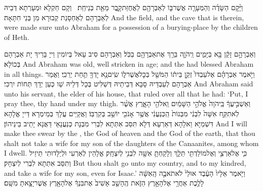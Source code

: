{וַיָּ֨קׇם הַשָּׂדֶ֜ה וְהַמְּעָרָ֧ה אֲשֶׁר\maqqaf בּ֛וֹ לְאַבְרָהָ֖ם לַאֲחֻזַּת\maqqaf קָ֑בֶר מֵאֵ֖ת בְּנֵי\maqqaf חֵֽת׃ \setuma }
{וְקָם חַקְלָא וּמְעָרְתָא דְּבֵיהּ לְאַבְרָהָם לְאַחְסָנַת קְבוּרָא מִן בְּנֵי חִתָּאָה׃}
{And the field, and the cave that is therein, were made sure unto Abraham for a possession of a burying-place by the children of Heth.}{}

\newperek
\newseder
{}%
{וְאַבְרָהָ֣ם זָקֵ֔ן בָּ֖א בַּיָּמִ֑ים וַֽיהֹוָ֛ה בֵּרַ֥ךְ אֶת\maqqaf אַבְרָהָ֖ם בַּכֹּֽל׃}
{וְאַבְרָהָם סִיב עָאל בְּיוֹמִין וַייָ בָּרֵיךְ יָת אַבְרָהָם בְּכוֹלָא׃}
{And Abraham was old, well stricken in age; and the \lord\space had blessed Abraham in all things.}{}
{וַיֹּ֣אמֶר אַבְרָהָ֗ם אֶל\maqqaf עַבְדּוֹ֙ זְקַ֣ן בֵּית֔וֹ הַמֹּשֵׁ֖ל בְּכׇל\maqqaf אֲשֶׁר\maqqaf ל֑וֹ שִֽׂים\maqqaf נָ֥א יָדְךָ֖ תַּ֥חַת יְרֵכִֽי׃}
{וַאֲמַר אַבְרָהָם לְעַבְדֵּיהּ סָבָא דְּבֵיתֵיהּ דְּשַׁלִּיט בְּכָל דְּלֵיהּ שַׁו כְּעַן יְדָךְ תְּחוֹת יִרְכִּי׃}
{And Abraham said unto his servant, the elder of his house, that ruled over all that he had: ‘Put, I pray thee, thy hand under my thigh.}{}
{וְאַשְׁבִּ֣יעֲךָ֔ בַּֽיהֹוָה֙ אֱלֹהֵ֣י הַשָּׁמַ֔יִם וֵֽאלֹהֵ֖י הָאָ֑רֶץ אֲשֶׁ֨ר לֹֽא\maqqaf תִקַּ֤ח אִשָּׁה֙ לִבְנִ֔י מִבְּנוֹת֙ הַֽכְּנַעֲנִ֔י אֲשֶׁ֥ר אָנֹכִ֖י יוֹשֵׁ֥ב בְּקִרְבּֽוֹ׃}
{וַאֲקַיֵּים עֲלָךְ בְּמֵימְרָא דַּייָ אֱלָהָא דִּשְׁמַיָּא וֵאלָהָא דְּאַרְעָא דְּלָא תִּסַּב אִתְּתָא לִבְרִי מִבְּנָת כְּנַעֲנָאֵי דַּאֲנָא יָתֵיב בֵּינֵיהוֹן׃}
{And I will make thee swear by the \lord, the God of heaven and the God of the earth, that thou shalt not take a wife for my son of the daughters of the Canaanites, among whom I dwell.}{}
{כִּ֧י אֶל\maqqaf אַרְצִ֛י וְאֶל\maqqaf מוֹלַדְתִּ֖י תֵּלֵ֑ךְ וְלָקַחְתָּ֥ אִשָּׁ֖ה לִבְנִ֥י לְיִצְחָֽק׃}
{אֱלָהֵין לְאַרְעִי וּלְיַלָּדוּתִי תֵּיזֵיל וְתִסַּב אִתְּתָא לִבְרִי לְיִצְחָק׃}
{But thou shalt go unto my country, and to my kindred, and take a wife for my son, even for Isaac.’}{}
{וַיֹּ֤אמֶר אֵלָיו֙ הָעֶ֔בֶד אוּלַי֙ לֹא\maqqaf תֹאבֶ֣ה הָֽאִשָּׁ֔ה לָלֶ֥כֶת אַחֲרַ֖י אֶל\maqqaf הָאָ֣רֶץ הַזֹּ֑את הֶֽהָשֵׁ֤ב אָשִׁיב֙ אֶת\maqqaf בִּנְךָ֔ אֶל\maqqaf הָאָ֖רֶץ אֲשֶׁר\maqqaf יָצָ֥אתָ מִשָּֽׁם׃}
